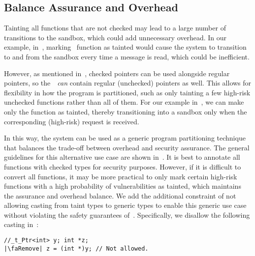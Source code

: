 \subsection{Balance Assurance and Overhead}
\label{subsec:otherusecases}


Tainting all functions that are not checked may lead to a large number of transitions to the sandbox, which could add unnecessary overhead. In our example, in~, marking~ function as tainted would cause the system to transition to and from the sandbox every time a message is read, which could be inefficient. 

However, as mentioned in~, checked pointers can be used alongside regular pointers, so the~\cregion{}~\emph{can} contain regular (unchecked) pointers as well.
This allows for flexibility in how the program is partitioned, such as only tainting a few high-risk unchecked functions rather than all of them. 
For our example in~, we can make only the function  as tainted, thereby transitioning into a sandbox only when the corresponding (high-risk) request is received.


In this way, the system can be used as a generic program partitioning technique that balances the trade-off between overhead and security assurance.
The general guidelines for this alternative use case are shown in~.
It is best to annotate all functions with checked types for security purposes. However, if it is difficult to convert all functions, it may be more practical to only mark certain high-risk functions with a high probability of vulnerabilities as tainted,
which maintains the assurance and overhead balance.
We add the additional constraint of not allowing casting from taint types to generic types to enable this generic use case without violating the safety guarantees of~\systemname.
Specifically, we disallow the following casting in~\cregion:
\begin{verbatim}
//_t_Ptr<int> y; int *z;
|\faRemove| z = (int *)y; // Not allowed.
\end{verbatim}
\iffalse

